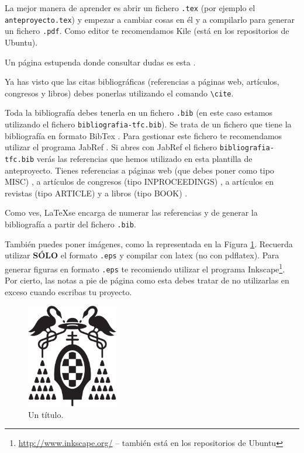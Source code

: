 \documentclass[12pt,oneside,a4paper]{article}
\begin{document}
La mejor manera de aprender es abrir un fichero \verb$.tex$ (por ejemplo el \verb$anteproyecto.tex$) y empezar a cambiar cosas en él y a compilarlo para generar un fichero \verb$.pdf$. Como editor te recomendamos Kile \cite{kile} (está en los repositorios de Ubuntu).

Un página estupenda donde consultar dudas es esta \cite{wikibook}.

Ya has visto que las citas bibliográficas (referencias a páginas web, artículos, congresos y libros) debes ponerlas utilizando el comando \verb$\cite$.

Toda la bibliografía debes tenerla en un fichero \verb$.bib$ (en este caso estamos utilizando el fichero \verb$bibliografia-tfc.bib$). Se trata de un fichero que tiene la bibliografía en formato BibTex \cite{bibtex}. Para gestionar este fichero te recomendamos utilizar el programa JabRef \cite{jabref}. Si abres con JabRef el fichero \verb$bibliografia-tfc.bib$ verás las referencias que hemos utilizado en esta plantilla de anteproyecto. Tienes referencias a páginas web (que debes poner como tipo MISC) \cite{bibtex,jabref,wikibook}, a artículos de congresos (tipo INPROCEEDINGS) \cite{Lowe1999}, a artículos en revistas (tipo ARTICLE) \cite{Tuytelaars2008} y a libros (tipo BOOK) \cite{hartley2006}.

Como ves, \LaTeX se encarga de numerar las referencias y de generar la bibliografía a partir del fichero \verb$.bib$.

También puedes poner imágenes, como la representada en la Figura \ref{fig:ejemplo}. Recuerda utilizar \textbf{SÓLO} el formato \verb$.eps$ y compilar con latex (no con pdflatex). Para generar figuras en formato \verb$.eps$ te recomiendo utilizar el programa Inkscape\footnote{\url{http://www.inkscape.org/} -- también está en los repositorios de Ubuntu}. Por cierto, las notas a pie de página como esta debes tratar de no utilizarlas en exceso cuando escribas tu proyecto.

\begin{figure}
  \centering
  \includegraphics[width=4cm]{figuras/logo-uah.eps}
  \caption{Un título.}
  \label{fig:ejemplo}
\end{figure}




\end{document}
